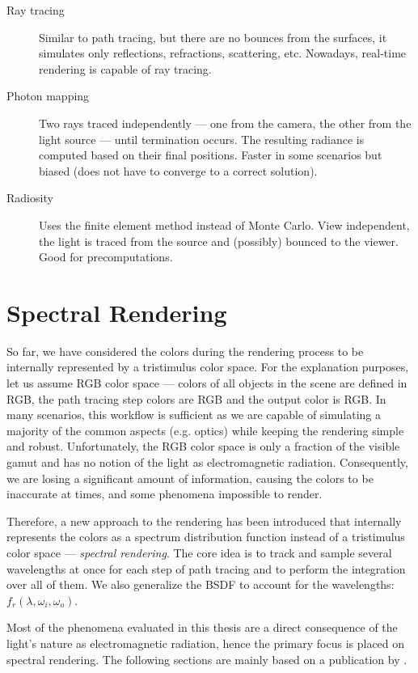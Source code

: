 \begin{description}
	\item[Ray tracing]\cite{glassner1989introduction} Similar to path tracing, but there are no bounces from the surfaces, it simulates only reflections, refractions, scattering, etc. Nowadays, real-time rendering is capable of ray tracing.
	\item[Photon mapping]\cite{jensen2001realistic} Two rays traced independently --- one from the camera, the other from the light source --- until termination occurs. The resulting radiance is computed based on their final positions. Faster in some scenarios but biased (does not have to converge to a correct solution).
	\item[Radiosity]\cite{sillion1994radiosity}Uses the finite element method instead of Monte Carlo. View independent, the light is traced from the source and (possibly) bounced to the viewer. Good for precomputations. 
\end{description}

\section{Spectral Rendering}

So far, we have considered the colors during the rendering process to be internally represented by a tristimulus color space. For the explanation purposes, let us assume RGB color space --- colors of all objects in the scene are defined in RGB, the path tracing step colors are RGB and the output color is RGB. In many scenarios, this workflow is sufficient as we are capable of simulating a majority of the common aspects (e.g. optics) while keeping the rendering simple and robust. Unfortunately, the RGB color space is only a fraction of the visible gamut and has no notion of the light as electromagnetic radiation. Consequently, we are losing a significant amount of information, causing the colors to be inaccurate at times, and some phenomena impossible to render. 

Therefore, a new approach to the rendering has been introduced that internally represents the colors as a spectrum distribution function instead of a tristimulus color space --- \emph{spectral rendering}. The core idea is to track and sample several wavelengths at once for each step of path tracing and to perform the integration over all of them. We also generalize the BSDF to account for the wavelengths: $f_r(\lambda,\omega_i,\omega_o)$.

Most of the phenomena evaluated in this thesis are a direct consequence of the light's nature as electromagnetic radiation, hence the primary focus is placed on spectral rendering.
The following sections are mainly based on a publication by \citet{wilkie2002tone}.

